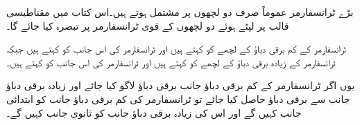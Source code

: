 بڑے ٹرانسفارمر عموماً صرف دو لچھوں پر مشتمل ہوتے ہیں۔اس کتاب میں مقناطیسی قالب پر لپٹے ہوئے دو لچھوں کے  قوی ٹرانسفارمر پر تبصرہ کیا جائے گا۔

ٹرانسفارمر کے کم برقی دباؤ کے لچھے کو   کہتے ہیں اور ٹرانسفارمر کی اس جانب کو   کہتے ہیں جبکہ ٹرانسفارمر کے زیادہ برقی دباؤ کے لچھے کو   کہتے ہیں اور ٹرانسفارمر کی اس جانب کو   کہتے ہیں۔

یوں اگر ٹرانسفارمر کے کم برقی دباؤ  جانب برقی دباؤ لاگو کیا جائے اور زیادہ برقی دباؤ  جانب سے برقی دباؤ حاصل کیا جائے تو ٹرانسفارمر کی کم برقی دباؤ  جانب کو ابتدائی جانب کہیں گے اور اس کی زیادہ برقی دباؤ  جانب کو ثانوی جانب کہیں گے۔

